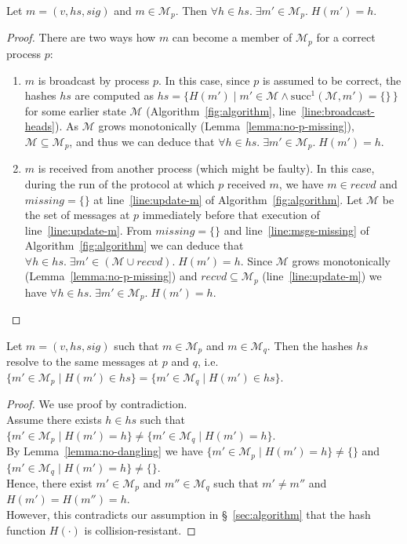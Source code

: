 \documentclass[a4paper,anonymous,USenglish]{lipics-v2019}
\begin{document}
\begin{lemma}\label{lemma:no-dangling}
Let $m = (v, \mathit{hs}, \mathit{sig})$ and $m \in \mathcal{M}_p$.
Then $\forall h \in \mathit{hs}.\; \exists m' \in \mathcal{M}_p.\; H(m') = h$.
\end{lemma}
\begin{proof}
There are two ways how $m$ can become a member of $\mathcal{M}_p$ for a correct process $p$:
\begin{enumerate}
    \item $m$ is broadcast by process $p$.
    In this case, since $p$ is assumed to be correct, the hashes $\mathit{hs}$ are computed as $\mathit{hs} = \{H(m') \mid m' \in \mathcal{M} \wedge \mathrm{succ}^1(\mathcal{M}, m') = \{\}\,\}$ for some earlier state $\mathcal{M}$ (Algorithm~\ref{fig:algorithm}, line~\ref{line:broadcast-heads}).
    As $\mathcal{M}$ grows monotonically (Lemma~\ref{lemma:no-p-missing}), $\mathcal{M} \subseteq \mathcal{M}_p$, and thus we can deduce that $\forall h \in \mathit{hs}.\; \exists m' \in \mathcal{M}_p.\; H(m') = h$.
    \item $m$ is received from another process (which might be faulty).
    In this case, during the run of the protocol at which $p$ received $m$, we have $m \in \mathit{recvd}$ and $\mathit{missing} = \{\}$ at line~\ref{line:update-m} of Algorithm~\ref{fig:algorithm}.
    Let $\mathcal{M}$ be the set of messages at $p$ immediately before that execution of line~\ref{line:update-m}.
    From $\mathit{missing} = \{\}$ and line~\ref{line:msgs-missing} of Algorithm~\ref{fig:algorithm} we can deduce that $\forall h \in \mathit{hs}.\; \exists m' \in (\mathcal{M} \cup \mathit{recvd}).\; H(m') = h$.
    Since $\mathcal{M}$ grows monotonically (Lemma~\ref{lemma:no-p-missing}) and $\mathit{recvd} \subseteq \mathcal{M}_p$ (line~\ref{line:update-m}) we have $\forall h \in \mathit{hs}.\; \exists m' \in \mathcal{M}_p.\; H(m') = h$.
\end{enumerate}
\end{proof}

\begin{lemma}\label{lemma:no-collision}
Let $m = (v, \mathit{hs}, \mathit{sig})$ such that $m \in \mathcal{M}_p$ and $m \in \mathcal{M}_q$.
Then the hashes $\mathit{hs}$ resolve to the same messages at $p$ and $q$, i.e.\ $\{m' \in \mathcal{M}_p \mid H(m') \in \mathit{hs}\} = \{m' \in \mathcal{M}_q \mid H(m') \in \mathit{hs}\}$.
\end{lemma}
\begin{proof}
We use proof by contradiction.\\
Assume there exists $h \in \mathit{hs}$ such that $\{m' \in \mathcal{M}_p \mid H(m') = h\} \neq \{m' \in \mathcal{M}_q \mid H(m') = h\}$.\\
By Lemma~\ref{lemma:no-dangling} we have $\{m' \in \mathcal{M}_p \mid H(m') = h\} \neq \{\}$ and $\{m' \in \mathcal{M}_q \mid H(m') = h\} \neq \{\}$.\\
Hence, there exist $m' \in \mathcal{M}_p$ and $m'' \in \mathcal{M}_q$ such that $m' \neq m''$ and $H(m') = H(m'') = h$.\\
However, this contradicts our assumption in \S~\ref{sec:algorithm} that the hash function $H(\cdot)$ is collision-resistant.
\end{proof}
\end{document}
